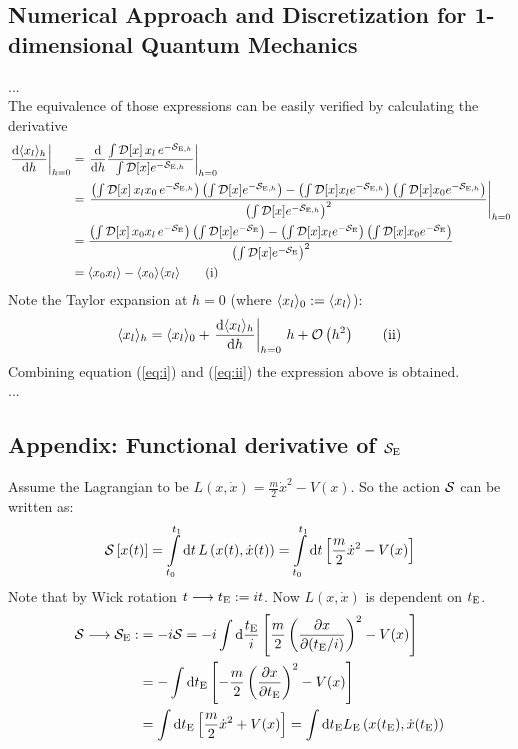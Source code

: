 \subsection{Numerical Approach and Discretization
for 1-dimensional Quantum Mechanics}
...\\
The equivalence of those expressions can be easily verified by calculating the derivative\\
\begin{align*}
    \eval{\dv{\avg{x_l}_h}{h}}_{h=0} &=
    \eval{\dv{h}\frac{\pathinth{\,x_l\,}}{\pathinth{}}}_{h=0} \\ &=
    \eval{\frac{\left(\pathinth{\,x_l x_0\,}\right)\left(\pathinth{}\right)
    -\left(\pathinth{x_l}\right)\left(\pathinth{x_0}\right)}
    {\left(\pathinth{}\right)^2}}_{h=0} \\ &=
    \frac{\left(\pathint{\,x_0 x_l\,}\right)\left(\pathint{}\right)
    -\left(\pathint{x_l}\right)\left(\pathint{x_0}\right)}
    {\left(\pathint{}\right)^2} \\ &=
    \avg{x_0 x_l}-\avg{x_0}\avg{x_l} \tag{i}\label{eq:i}
\end{align*}
Note the Taylor expansion at $h=0$ (where $\langle x_l\rangle_0:=\langle x_l\rangle$):
\begin{equation*}
    \avg{x_l}_h=\avg{x_l}_0+\eval{\dv{\avg{x_l}_h}{h}}_{h=0}\,h+\BigO{h^2}
    \tag{ii}\label{eq:ii}
\end{equation*}
Combining equation (\ref{eq:i}) and (\ref{eq:ii}) the expression above is obtained.\\
...\\

\newpage
\subsection{Appendix: Functional derivative of $\mathcal{S}_{\mathrm{E}}$\label{app:derivSE}}

Assume the Lagrangian to be $L(x,\dot{x})=\frac{m}{2} \dot{x}^2-V(x)$. So the action $\mathcal{S}$ can be written as:
\begin{align}
    \mathcal{S}\left[x(t)\right] = \int\limits_{t_0}^{t_1}\dd{t}L\left(x(t), \dot{x}(t)\right) = \int\limits_{t_0}^{t_1}\dd{t}\left[\frac{m}{2}\dot{x}^2-V(x)\right]\label{eq:S}
\end{align}
\noindent Note that by Wick rotation $t\longrightarrow t_{\mathrm{E}}:=it$. Now $L(x,\dot{x})$ is dependent on $t_{\mathrm{E}}$.
\begin{align}
    \mathcal{S}\longrightarrow\mathcal{S}_{\mathrm{E}}:&=-i\mathcal{S}
    =-i\int\dd\frac{t_{\mathrm{E}}}{i}\left[\frac{m}{2}\left(\pdv{x}{(\ensuremath{t_{\mathrm{E}}}/i)}\right)^2-V(x)\right] \\
    &=-\int\dd t_{\mathrm{E}}\left[-\frac{m}{2}\left(\pdv{x}{\ensuremath{t_{\mathrm{E}}}}\right)^2-V(x)\right] \\
    &=\int\dd t_{\mathrm{E}}\left[\frac{m}{2}\dot{x}^2+V(x)\right] =  \int\dd t_{\mathrm{E}} L_\mathrm{E}\left(x(t_\mathrm{E}), \dot{x}(t_\mathrm{E})\right)\label{eq:SE}
\end{align}

